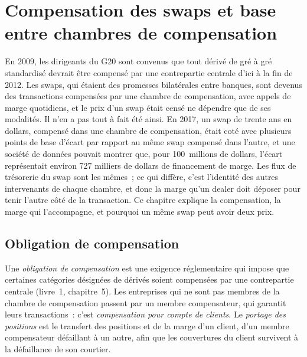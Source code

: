 \chapter{Compensation des swaps et base entre chambres de compensation}\label{ch:m2:swap-clearing-and-the-ccp-basis}

En 2009, les dirigeants du G20 sont convenus que tout dérivé de gré à gré standardisé
devrait être compensé par une contrepartie centrale d'ici à la fin de
2012. Les swaps, qui étaient des promesses bilatérales entre banques, sont devenus des transactions
compensées par une chambre de compensation, avec appels de marge quotidiens, et le prix d'un swap était censé
ne dépendre que de ses modalités. Il n'en a pas tout à fait été ainsi. En 2017, un swap
de trente ans en dollars, compensé dans une chambre de compensation, était coté avec plusieurs
points de base d'écart par rapport au même swap compensé dans l'autre, et une société de données
pouvait montrer que, pour 100~millions de dollars, l'écart représentait environ 727
milliers de dollars de financement de marge. Les flux de trésorerie du swap sont les mêmes~; ce qui
diffère, c'est l'identité des autres intervenants de chaque chambre, et donc la marge qu'un
dealer doit déposer pour tenir l'autre côté de la transaction. Ce chapitre explique la compensation,
la marge qui l'accompagne, et pourquoi un même swap peut avoir deux prix.

\section{Obligation de compensation}

\begin{definition}\label{def:m2:swap-clearing-and-the-ccp-basis:mandate}
Une \emph{obligation de compensation} est une exigence réglementaire
qui impose que certaines catégories désignées de dérivés soient compensées par une
contrepartie centrale (livre~1, chapitre~5). Les entreprises qui ne sont pas membres de la
chambre de compensation passent par un membre compensateur, qui garantit leurs transactions~: c'est
\emph{compensation pour compte de clients}. Le \emph{portage des positions} est
le transfert des positions et de la marge d'un client, d'un membre compensateur défaillant
à un autre, afin que les couvertures du client survivent à la défaillance de son courtier.
\end{definition}

